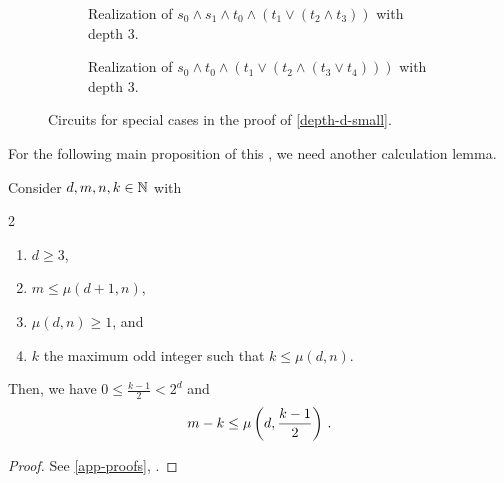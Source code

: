 \begin{figure}[!h]
\begin{center}
  \begin{subfigure}[t]{0.48\textwidth}
  \begin{center}
  \end{center}
 \caption{Realization of $s_0 \land s_1 \land t_0 \land (t_1 \lor (t_2 \land t_3 ))$
    with depth 3.}
 \label{img-proof_small_1}
\end{subfigure}
\hspace*{0.02\textwidth}
\begin{subfigure}[t]{0.48\textwidth}
  \begin{center}
  \end{center}
 \caption{Realization of $s_0 \land t_0 \land (t_1 \lor (t_2 \land (t_3 \lor t_4)))$ 
     with depth 3.}
 \label{img-proof_small_2}
\end{subfigure}
\end{center}
\caption{Circuits for special cases in the proof of \cref{depth-d-small}.}
\end{figure}

For the following main proposition of this ,
we need another calculation lemma.

\begin{lemma} \label{m-k-small-enough}
  Consider $d, m, n, k \in \mathbb N$ with
  \begin{multicols}{2}
  \begin{enumerate}
   \item $d \geq 3$, \label{cond-d-large}
   \item $m \leq \mu(d+1, n)$, \label{cond-m-small}
   \item $\mu(d, n) \geq 1$, and \label{cond-mu-large}
   \item $k$ the maximum odd integer such that $k \leq \mu(d, n)$. \label{cond-k-odd}
  \end{enumerate}
  \end{multicols}
  Then, we have $0 \leq \frac{k-1}{2} < 2^d$ and
  \begin{equation} \label{to-show}
   m - k \leq \mu \left({d, \frac{k-1}{2}}\right)\,.
  \end{equation}
\begin{proof}
See \cref{app-proofs}, .
\end{proof}
\end{lemma}

